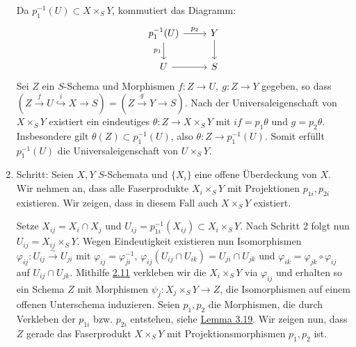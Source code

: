 \begin{enumerate}
Da $p_1^{-1}(U)\subset X\times_SY$, kommutiert das Diagramm:
\[\begin{tikzcd}
p_1^{-1}(U)\ar[r, "p_2"]\ar[d, "p_1"'] & Y\ar[d]\\
U\ar[r] & S
\end{tikzcd} \]
Sei $Z$ ein $S$-Schema und Morphismen $f:Z\to U,\ g:Z\to Y$ gegeben, so dass $(Z\stackrel{f}{\to} U\stackrel{i}{\hookrightarrow} X\to S)=(Z\stackrel{g}{\to} Y\to S)$. Nach der Universaleigenschaft von $X\times_SY$ existiert ein eindeutiges $\theta:Z\to X\times_SY$ mit $if=p_1\theta$ und $g=p_2\theta$. Insbesondere gilt $\theta(Z)\subset p_1^{-1}(U)$, also $\theta:Z\to p_1^{-1}(U)$. Somit erfüllt $p_1^{-1}(U)$ die Universaleigenschaft von $U\times_SY$.
\item Schritt: Seien $X,Y$ $S$-Schemata und $\{X_i\}$ eine offene Überdeckung von $X$. Wir nehmen an, dass alle Faserprodukte $X_i\times_SY$ mit Projektionen $p_{1i},p_{2i}$ existieren. Wir zeigen, dass in diesem Fall auch $X\times_SY$ existiert.

Setze $X_{ij}=X_i\cap X_j$ und $U_{ij}=p_{1i}^{-1}(X_{ij})\subset X_i\times_SY$. Nach Schritt 2 folgt nun $U_{ij}=X_{ij}\times_SY$. Wegen Eindeutigkeit existieren nun Isomorphismen $\varphi_{ij}:U_{ij}\stackrel{\sim}{\to}U_{ji}$ mit $\varphi_{ij}=\varphi_{ji}^{-1}$, $\varphi_{ij}(U_{ij}\cap U_{ik})=U_{ji}\cap U_{jk}$ und $\varphi_{ik}=\varphi_{jk}\circ\varphi_{ij}$ auf $U_{ij}\cap U_{jk}$. Mithilfe \hyperref[2.11]{2.11} verkleben wir die $X_i\times_SY$ via $\varphi_{ij}$ und erhalten so ein Schema $Z$ mit Morphismen $\psi_j:X_j\times_SY\to Z$, die Isomorphismen auf einem offenen Unterschema induzieren. Seien $p_1,p_2$ die Morphismen, die durch Verkleben der $p_{1i}$ bzw. $p_{2i}$ entstehen, siehe \hyperref[3.19]{Lemma 3.19}. Wir zeigen nun, dass $Z$ gerade das Faserprodukt $X\times_SY$ mit Projektionsmorphismen $p_1,p_2$ ist.


\end{enumerate}
